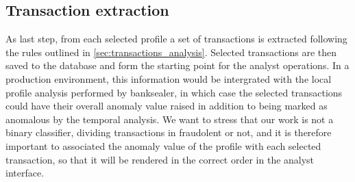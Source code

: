 \subsection{Transaction extraction}
As last step, from each selected profile a set of transactions is extracted following the rules outlined in \ref{sec:transactions_analysis}. Selected transactions are then saved to the database and form the starting point for the analyst operations. In a production environment, this information would be intergrated with the local profile analysis performed by banksealer, in which case the selected transactions could have their overall anomaly value raised in addition to being marked as anomalous by the temporal analysis.
We want to stress that our work is not a binary classifier, dividing transactions in fraudolent or not, and it is therefore important to associated the anomaly value of the profile with each selected transaction, so that it will be rendered in the correct order in the analyst interface.
